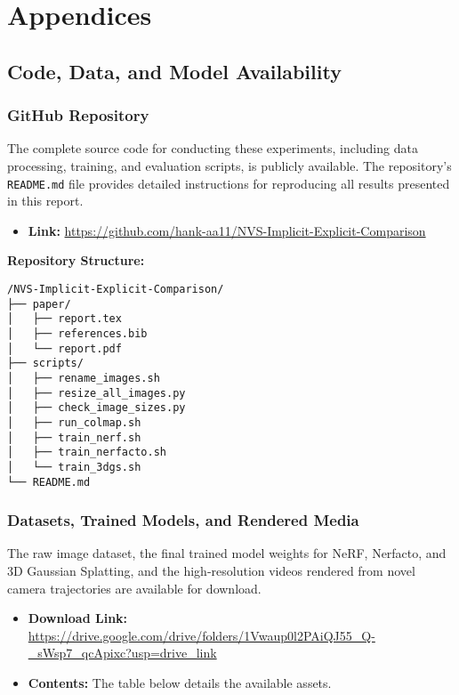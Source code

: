 \documentclass[11pt]{article}
\begin{document}
\section{Appendices}

\subsection{Code, Data, and Model Availability}

\subsubsection{GitHub Repository}
The complete source code for conducting these experiments, including data processing, training, and evaluation scripts, is publicly available. The repository's \texttt{README.md} file provides detailed instructions for reproducing all results presented in this report.
\begin{itemize}
    \item \textbf{Link:} \url{https://github.com/hank-aa11/NVS-Implicit-Explicit-Comparison}
\end{itemize}

\vspace{5pt}
\textbf{Repository Structure:}
\begin{verbatim}
/NVS-Implicit-Explicit-Comparison/
├── paper/
│   ├── report.tex
│   ├── references.bib
│   └── report.pdf
├── scripts/
│   ├── rename_images.sh
│   ├── resize_all_images.py
│   ├── check_image_sizes.py
│   ├── run_colmap.sh
│   ├── train_nerf.sh
│   ├── train_nerfacto.sh
│   └── train_3dgs.sh
└── README.md
\end{verbatim}

\subsubsection{Datasets, Trained Models, and Rendered Media}
The raw image dataset, the final trained model weights for NeRF, Nerfacto, and 3D Gaussian Splatting, and the high-resolution videos rendered from novel camera trajectories are available for download.
\begin{itemize}
    \item \textbf{Download Link:} \url{https://drive.google.com/drive/folders/1Vwaup0l2PAiQJ55_Q-_sWsp7_qcApixc?usp=drive_link}
    \item \textbf{Contents:} The table below details the available assets. 
\end{itemize}
\end{document}
